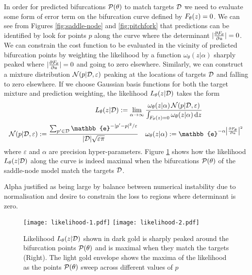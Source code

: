 In order for predicted bifurcations $\mathcal{P}(\theta)$ to match targets $\mathcal{D}$ we need to evaluate some form of error term on the bifurcation curve defined by $F_{\theta}(z)=0$. We can see from Figures \ref{fig:saddle-node} and \ref{fig:pitchfork} that predictions can be identified by look for points $p$ along the curve where the determinant $|\frac{\partial F_{\theta}}{\partial u}|=0$. We can constrain the cost function to be evaluated in the vicinity of predicted bifurcation points by weighting the likelihood by a function $\omega_\theta(z|\alpha)$ sharply peaked where $|\frac{\partial F_{\theta}}{\partial u}|=0$ and going to zero elsewhere. Similarly, we can construct a mixture distribution $\mathcal{N}(p|\mathcal{D},\varepsilon)$ peaking at the locations of targets $\mathcal{D}$ and falling to zero elsewhere. If we choose Gaussian basis functions for both the target mixture and prediction weighting, the likelihood $L_{\theta}(z|\mathcal{D})$ takes the form
\begin{align}
    L_{\theta}(z|\targets) := 
    \lim_{\alpha\rightarrow\infty}\frac{\omega_\theta(z|\alpha)\,\mathcal{N}(p|\targets,\varepsilon)}{\int_{\rates(z)=0} \omega_\theta(z|\alpha)\,\mathrm{d}z}\label{eq:likelihood}\qquad\qquad\qquad\\
    \mathcal{N}(p|\targets,\varepsilon):=\frac{\sum_{p'\in\targets}\mathbb{e}^{-|p'-p|^2/\varepsilon}}{|\targets|\sqrt{\varepsilon\pi}}
    \quad
    \omega_\theta(z|\alpha):= \mathbb{e}^{-\alpha\left|\frac{\partial F_{\theta}}{\partial u}\right|^2}
\end{align}
where $\varepsilon$ and $\alpha$ are precision hyper-parameters. Figure \ref{fig:likelihood} shows how the likelihood $L_{\theta}(z|\mathcal{D})$ along the curve is indeed maximal when the bifurcations $\mathcal{P}(\theta)$ of the saddle-node model match the targets $\mathcal{D}$.

Alpha justified as being large by balance between numerical instability due to normalisation and desire to constrain the loss to regions where determinant is zero.

\begin{figure}[H]
\centering{}
\captionsetup{justification=centering}
\texttt{[image: likelihood-1.pdf]}
\texttt{[image: likelihood-2.pdf]}
\caption{Likelihood $L_{\theta}(z|\mathcal{D})$ shown in dark gold is sharply peaked around the bifurcation points $\mathcal{P}(\theta)$ and is maximal when they match the targets (Right). The light gold envelope shows the maxima of the likelihood as the points $\mathcal{P}(\theta)$ sweep across different values of $p$}
\label{fig:likelihood}
\end{figure}

